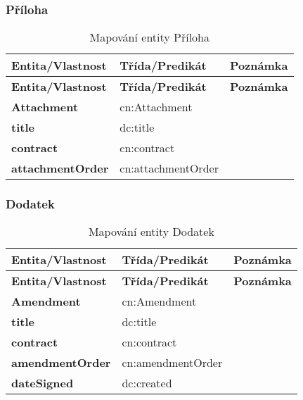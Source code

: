 \subsubsection*{Příloha}

\begin{center}
\begin{longtable}{lp{30mm}p{65mm}}
\label{grid_mlmmh} \\
\multicolumn{1}{l}{\textbf{Entita/Vlastnost}} & 
\multicolumn{1}{l}{\textbf{Třída/Predikát}} & 
\multicolumn{1}{l}{\textbf{Poznámka}} \\ \hline 
\endfirsthead
\multicolumn{1}{l}{\textbf{Entita/Vlastnost}} & 
\multicolumn{1}{l}{\textbf{Třída/Predikát}} & 
\multicolumn{1}{l}{\textbf{Poznámka}} \\ \hline 
\hline
\endhead
\endfoot
\caption{Mapování entity Příloha}
\endlastfoot
\textbf{Attachment} & cn:Attachment & \\
\textbf{title} & dc:title \\
\textbf{contract} & cn:contract \\
\textbf{attachmentOrder} & cn:attachmentOrder \\
\end{longtable}
\end{center}

\subsubsection*{Dodatek}

\begin{center}
\begin{longtable}{lp{30mm}p{65mm}}
\label{grid_mlmmh} \\
\multicolumn{1}{l}{\textbf{Entita/Vlastnost}} & 
\multicolumn{1}{l}{\textbf{Třída/Predikát}} & 
\multicolumn{1}{l}{\textbf{Poznámka}} \\ \hline 
\endfirsthead
\multicolumn{1}{l}{\textbf{Entita/Vlastnost}} & 
\multicolumn{1}{l}{\textbf{Třída/Predikát}} & 
\multicolumn{1}{l}{\textbf{Poznámka}} \\ \hline 
\hline
\endhead
\endfoot
\caption{Mapování entity Dodatek}
\endlastfoot
\textbf{Amendment} & cn:Amendment & \\
\textbf{title} & dc:title \\
\textbf{contract} & cn:contract \\
\textbf{amendmentOrder} & cn:amendmentOrder \\
\textbf{dateSigned} & dc:created \\
\end{longtable}
\end{center}

